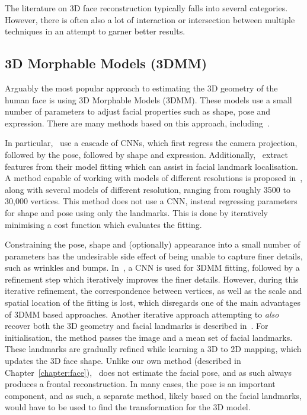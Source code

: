 
The literature on 3D face reconstruction typically falls into several
categories. However, there is often also a lot of interaction or
intersection between multiple techniques in an attempt to garner
better results.

\subsection{3D Morphable Models (3DMM)}
Arguably the most popular approach to estimating the 3D geometry of
the human face is using 3D Morphable Models (3DMM). These models use a
small number of parameters to adjust facial properties such as shape,
pose and expression. There are many methods based on this approach,
including~\cite{jourabloo2016large,huber2016multiresolution,zhu2016face,liu2016joint,tran2018extreme,jiang20183d,jiang2018pose}.

In particular,~\cite{jourabloo2016large} use a cascade of CNNs, which
first regress the camera projection, followed by the pose, followed by
shape and expression. Additionally,~\cite{jourabloo2016large} extract
features from their model fitting which can assist in facial landmark
localisation. A method capable of working with models of different
resolutions is proposed in~\cite{huber2016multiresolution}, along with
several models of different resolution, ranging from roughly 3500 to
30,000 vertices. This method does not use a CNN, instead regressing
parameters for shape and pose using only the landmarks. This is done
by iteratively minimising a cost function which evaluates the fitting.

Constraining the pose, shape and (optionally) appearance into a small
number of parameters has the undesirable side effect of being unable
to capture finer details, such as wrinkles and
bumps. In~\cite{tran2018extreme}, a CNN is used for 3DMM fitting,
followed by a refinement step which iteratively improves the finer
details. However, during this iterative refinement, the correspondence
between vertices, as well as the scale and spatial location of the
fitting is lost, which disregards one of the main advantages of 3DMM
based approaches. Another iterative approach attempting to
\textit{also} recover both the 3D geometry and facial landmarks is
described in~\cite{liu2016joint}. For initialisation, the method
passes the image and a mean set of facial landmarks. These landmarks
are gradually refined while learning a 3D to 2D mapping, which updates
the 3D face shape. Unlike our own method (described in
Chapter~\ref{chapter:face}),~\cite{liu2016joint} does not estimate the
facial pose, and as such always produces a frontal
reconstruction. In many cases, the pose is an important component, and
as such, a separate method, likely based on the facial landmarks,
would have to be used to find the transformation for the 3D model.

